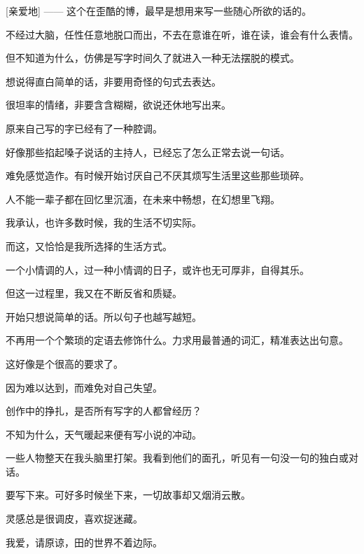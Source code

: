 	\endwriting



		[亲爱地] —— 这个在歪酷的博，最早是想用来写一些随心所欲的话的。\par
		不经过大脑，任性任意地脱口而出，不去在意谁在听，谁在读，谁会有什么表情。\par
		但不知道为什么，仿佛是写字时间久了就进入一种无法摆脱的模式。\par
		想说得直白简单的话，非要用奇怪的句式去表达。\par
		很坦率的情绪，非要含含糊糊，欲说还休地写出来。

		原来自己写的字已经有了一种腔调。\par
		好像那些掐起嗓子说话的主持人，已经忘了怎么正常去说一句话。\par
		难免感觉造作。有时候开始讨厌自己不厌其烦写生活里这些那些琐碎。

		人不能一辈子都在回忆里沉湎，在未来中畅想，在幻想里飞翔。\par
		我承认，也许多数时候，我的生活不切实际。\par
		而这，又恰恰是我所选择的生活方式。\par
		一个小情调的人，过一种小情调的日子，或许也无可厚非，自得其乐。\par
		但这一过程里，我又在不断反省和质疑。

		开始只想说简单的话。所以句子也越写越短。\par
		不再用一个个繁琐的定语去修饰什么。力求用最普通的词汇，精准表达出句意。\par
		这好像是个很高的要求了。\par
		因为难以达到，而难免对自己失望。\par
		创作中的挣扎，是否所有写字的人都曾经历？

		不知为什么，天气暖起来便有写小说的冲动。\par
		一些人物整天在我头脑里打架。我看到他们的面孔，听见有一句没一句的独白或对话。\par
		要写下来。可好多时候坐下来，一切故事却又烟消云散。

		灵感总是很调皮，喜欢捉迷藏。

	\endwriting



		我爱，请原谅，田的世界不着边际。

